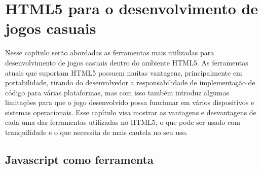 \section{HTML5 para o desenvolvimento de jogos casuais}

Nesse capítulo serão abordadas as ferramentas mais utilizadas para
desenvolvimento de jogos casuais dentro do ambiente HTML5.
As ferramentas atuais que suportam HTML5 possuem muitas vantagens,
principalmente em portabilidade, tirando do desenvolvedor a
responsabilidade de implementação de código para várias plataformas, mas
com isso também introduz algumas limitações para que o jogo
desenvolvido possa funcionar em vários dispositivos e sistemas
operacionais. Esse capítulo visa mostrar as vantagens e desvantagens
de cada uma das ferramentas utilizadas no HTML5, o que pode ser usado
com tranquilidade e o que necessita de mais cautela no seu uso.

\subsection{Javascript como ferramenta}

